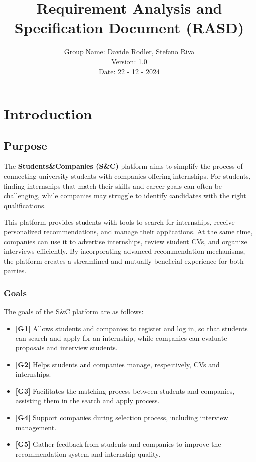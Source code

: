 \documentclass[12pt]{article}
\title{Requirement Analysis and Specification Document (RASD)}
\author{Group Name: Davide Rodler, Stefano Riva \\ Version: 1.0 \\ Date: 22 - 12 - 2024}
\date{}
\numberwithin{figure}{section}
\numberwithin{table}{section}
\begin{document}
\maketitle

\newpage

\tableofcontents

\newpage

\section{Introduction}

\subsection{Purpose}
The \textbf{Students\&Companies (S\&C)} platform aims to simplify the process of connecting university students with companies offering internships. For students, finding internships that match their skills and career goals can often be challenging, while companies may struggle to identify candidates with the right qualifications.

This platform provides students with tools to search for internships, receive personalized recommendations, and manage their applications. At the same time, companies can use it to advertise internships, review student CVs, and organize interviews efficiently. By incorporating advanced recommendation mechanisms, the platform creates a streamlined and mutually beneficial experience for both parties.

\subsubsection{Goals}
The goals of the S\&C platform are as follows:
\begin{itemize}
    \item \textbf{[G1]} Allows students and companies to register and log in, so that students can search and apply for an internship, while companies can evaluate proposals and interview students.
    \item \textbf{[G2]} Helps students and companies manage, respectively, CVs and internships.
    \item \textbf{[G3]} Facilitates the matching process between students and companies, assisting them in the search and apply process.
    \item \textbf{[G4]} Support companies during selection process, including interview management.
    \item \textbf{[G5]} Gather feedback from students and companies to improve the recommendation system and internship quality.
\end{itemize}
\end{document}
